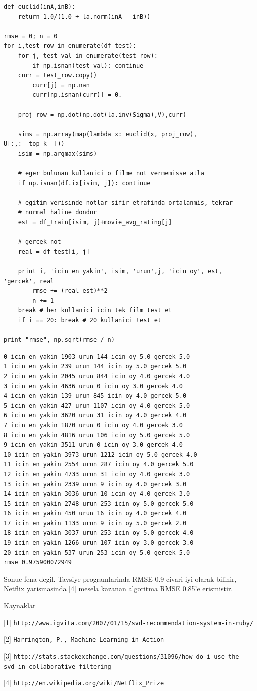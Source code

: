 \documentclass[12pt,fleqn]{article}\usepackage{../common}
\begin{document}
\begin{verbatim}
def euclid(inA,inB):
    return 1.0/(1.0 + la.norm(inA - inB))
    
rmse = 0; n = 0
for i,test_row in enumerate(df_test):
    for j, test_val in enumerate(test_row):
        if np.isnan(test_val): continue	
	curr = test_row.copy()
        curr[j] = np.nan
        curr[np.isnan(curr)] = 0.

	proj_row = np.dot(np.dot(la.inv(Sigma),V),curr)

	sims = np.array(map(lambda x: euclid(x, proj_row), U[:,:__top_k__]))
	isim = np.argmax(sims)

	# eger bulunan kullanici o filme not vermemisse atla
	if np.isnan(df.ix[isim, j]): continue

	# egitim verisinde notlar sifir etrafinda ortalanmis, tekrar
	# normal haline dondur
	est = df_train[isim, j]+movie_avg_rating[j]

	# gercek not
	real = df_test[i, j]

	print i, 'icin en yakin', isim, 'urun',j, 'icin oy', est, 'gercek', real
        rmse += (real-est)**2
        n += 1
	break # her kullanici icin tek film test et
    if i == 20: break # 20 kullanici test et

print "rmse", np.sqrt(rmse / n)
\end{verbatim}

\begin{verbatim}
0 icin en yakin 1903 urun 144 icin oy 5.0 gercek 5.0
1 icin en yakin 239 urun 144 icin oy 5.0 gercek 5.0
2 icin en yakin 2045 urun 844 icin oy 4.0 gercek 4.0
3 icin en yakin 4636 urun 0 icin oy 3.0 gercek 4.0
4 icin en yakin 139 urun 845 icin oy 4.0 gercek 5.0
5 icin en yakin 427 urun 1107 icin oy 4.0 gercek 5.0
6 icin en yakin 3620 urun 31 icin oy 4.0 gercek 4.0
7 icin en yakin 1870 urun 0 icin oy 4.0 gercek 3.0
8 icin en yakin 4816 urun 106 icin oy 5.0 gercek 5.0
9 icin en yakin 3511 urun 0 icin oy 3.0 gercek 4.0
10 icin en yakin 3973 urun 1212 icin oy 5.0 gercek 4.0
11 icin en yakin 2554 urun 287 icin oy 4.0 gercek 5.0
12 icin en yakin 4733 urun 31 icin oy 4.0 gercek 3.0
13 icin en yakin 2339 urun 9 icin oy 4.0 gercek 3.0
14 icin en yakin 3036 urun 10 icin oy 4.0 gercek 3.0
15 icin en yakin 2748 urun 253 icin oy 5.0 gercek 5.0
16 icin en yakin 450 urun 16 icin oy 4.0 gercek 4.0
17 icin en yakin 1133 urun 9 icin oy 5.0 gercek 2.0
18 icin en yakin 3037 urun 253 icin oy 5.0 gercek 4.0
19 icin en yakin 1266 urun 107 icin oy 3.0 gercek 3.0
20 icin en yakin 537 urun 253 icin oy 5.0 gercek 5.0
rmse 0.975900072949
\end{verbatim}

Sonuc fena degil. Tavsiye programlarinda RMSE 0.9 civari iyi olarak
bilinir, Netflix yarismasinda [4] mesela kazanan algoritma RMSE 0.85'e
erismistir.

Kaynaklar

[1] \verb!http://www.igvita.com/2007/01/15/svd-recommendation-system-in-ruby/!

[2] \verb!Harrington, P., Machine Learning in Action!

[3]
\verb!http://stats.stackexchange.com/questions/31096/how-do-i-use-the-svd-in-collaborative-filtering!

[4] \verb!http://en.wikipedia.org/wiki/Netflix_Prize!
\end{document}
